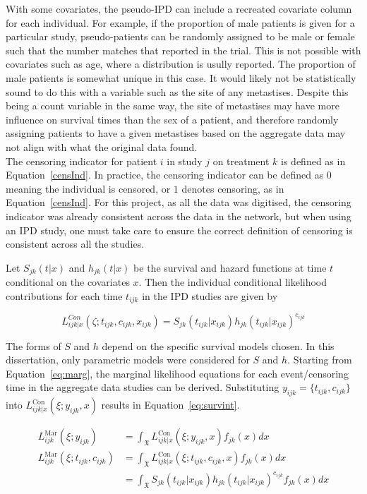 With some covariates, the pseudo-IPD can include a recreated covariate column for each individual. For example, if the proportion of male patients is given for a particular study, pseudo-patients can be randomly assigned to be male or female such that the number matches that reported in the trial. This is not possible with covariates such as age, where a distribution is usully reported. The proportion of male patients is somewhat unique in this case. It would likely not be statistically sound to do this with a variable such as the site of any metastises. Despite this being a count variable in the same way, the site of metastises may have more influence on survival times than the sex of a patient, and therefore randomly assigning patients to have a given metastises based on the aggregate data may not align with what the original data found. \\ 

The censoring indicator for patient $i$ in study $j$ on treatment $k$ is defined as in Equation~\ref{censInd}. In practice, the censoring indicator can be defined as $0$ meaning the individual is censored, or $1$ denotes censoring, as in Equation~\ref{censInd}. For this project, as all the data was digitised, the censoring indicator was already consistent across the data in the network, but when using an IPD study, one must take care to ensure the correct definition of censoring is consistent across all the studies. 

Let $S_{jk}(t|x)$ and $h_{jk}(t|x)$ be the survival and hazard functions at time $t$ conditional on the covariates $x$. Then the individual conditional likelihood contributions for each time $t_{ijk}$ in the IPD studies are given by

\begin{equation}
    L_{ijk|x}^{Con}(\zeta;t_{ijk},c_{ijk},x_{ijk}) = S_{jk}(t_{ijk}| x_{ijk})h_{jk}(t_{ijk}|x_{ijk})^{c_{ijk}}
\end{equation}

The forms of $S$ and $h$ depend on the specific survival models chosen. In this dissertation, only parametric models were considered for $S$ and $h$. Starting from Equation~\ref{eq:marg}, the marginal likelihood equations for each event/censoring time in the aggregate data studies can be derived. Substituting $y_{ijk} = \{t_{ijk}, c_{ijk}\}$ into $L_{ijk|x}^{\text{Con}}(\xi; y_{ijk}, x)$ results in Equation~\ref{eq:survint}.

\begin{align}
    L_{ijk}^{\text{Mar}}(\xi; y_{ijk}) &= \int_{\mathfrak{X}} L_{ijk|x}^{\text{Con}}(\xi; y_{ijk}, x)f_{jk}(x)dx \\ 
    L_{ijk}^{\text{Mar}}(\xi; t_{ijk}, c_{ijk}) &= \int_{\mathfrak{X}} L_{ijk|x}^{\text{Con}}(\xi; t_{ijk}, c_{ijk}, x)f_{jk}(x)dx \\
                                       &= \int_{\mathfrak{X}} S_{jk}(t_{ijk}| x_{ijk})h_{jk}(t_{ijk}|x_{ijk})^{c_{ijk}} f_{jk}(x)dx\label{eq:survint}
\end{align}


